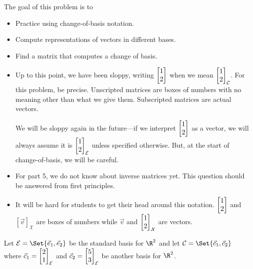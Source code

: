 	\question
	\begin{annotation}
		\begin{goals}

			The goal of this problem is to
		\displayonlynewpage
			\begin{itemize}
				\item Practice using change-of-basis notation.
				\item Compute representations of vectors in different bases.
				\item Find a matrix that computes a change of basis.
			\end{itemize}
		\end{goals}

		\begin{notes}
			\begin{itemize}
				\item Up to this point, we have been sloppy, writing $\mat{1\\2}$ when
					we mean $\mat{1\\2}_{\mathcal C}$. For this problem, be precise.
					Unscripted matrices are boxes of numbers with no meaning other
					than what we give them. Subscripted matrices are actual vectors.

					We will be sloppy again in the future---if we interpret $\mat{1\\2}$
					as a vector, we will always assume it is $\mat{1\\2}_{\mathcal E}$ unless
					specified otherwise. But, at the start of change-of-basis, we will be careful.
				\item For part 5, we do not know about inverse matrices yet. This question should
					be answered from first principles.
				\item It will be hard for students to get their head around this notation. $\mat{1\\2}$ and $[\vec v]_{\mathcal X}$
					are boxes of numbers while $\vec v$ and $\mat{1\\2}_{\mathcal X}$ are vectors.
			\end{itemize}
		\end{notes}
	\end{annotation}
	Let $\mathcal E=\Set{\xhat,\yhat}$ be the standard basis for $\R^2$ and
	let $\mathcal C=\Set{\vec c_1,\vec c_2}$ where $\vec c_1=\mat{2\\1}_{\mathcal E}$
	and $\vec c_2=\mat{5\\3}_{\mathcal E}$ be another basis for $\R^2$.
